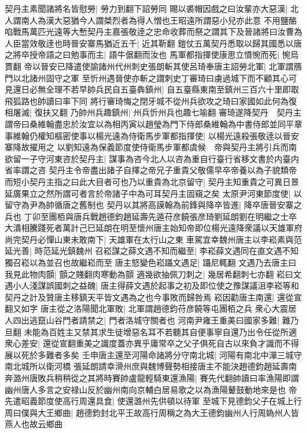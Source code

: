契丹主素聞諸將名皆慰勞|{
	勞力到翻下詔勞同}
賜以裘帽因戲之曰汝輩亦大惡漢|{
	北人謂南人為漢大惡猶今人謂桀烈者為得人憎也王昭遠所謂惡小兒亦此意}
不用鹽酪啗戰馬萬匹光遠等大慙契丹主嘉張敬逹之忠命收葬而祭之謂其下及晉諸將曰汝曹為人臣當效敬逹也時晉安寨馬猶近五千|{
	近其靳翻}
鎧仗五萬契丹悉取以歸其國悉以唐之將卒授帝語之曰勉事而主|{
	語牛倨翻而汝也}
馬軍都指揮使康思立憤惋而死|{
	惋烏貫翻}
帝以晉安已降遣使諭諸州代州刺史張朗斬其使呂琦奉唐主詔勞北軍|{
	北軍謂鴈門以北諸州固守之軍}
至忻州遇晉使亦斬之謂刺史丁審琦曰虜過城下而不顧其心可見還日必無全理不若早帥兵民自五臺犇鎮州|{
	自五臺縣東南至鎮州三百六十里即取飛狐路也帥讀曰率下同}
將行審琦悔之閉牙城不從州兵欲攻之琦曰家國如此何為復相屠滅|{
	復扶又翻}
乃帥州兵趣鎮州|{
	州兵忻州兵也趣七喻翻}
審琦遂降契丹　契丹主謂帝曰桑維翰盡忠於汝宜以為相丙寅以趙瑩為門下侍郎桑維翰為中書侍郎並同平章事維翰仍權知樞密使事以楊光遠為侍衛馬步軍都指揮使|{
	以楊光遠殺張敬逹以晉安寨降故擢用之}
以劉知遠為保義節度使侍衛馬步軍都虞候　帝與契丹主將引兵而南欲留一子守河東咨於契丹主|{
	謀事為咨今北人以咨為重自行臺行省移文書於内臺内省率謂之咨}
契丹主令帝盡出諸子自擇之帝兄子重貴父敬儒早卒帝養以為子貌類帝而短小契丹主指之曰此大目者可也乃以重貴為北京留守|{
	契丹主知重貴之可異日景延廣果立之然所謂可者言於帝諸子中為可耳契丹主固窺之矣}
太原尹河東節度使|{
	以留守為尹為帥循唐之舊制也}
契丹以其將高謨翰為前鋒與降卒皆進|{
	降卒唐晉安寨之兵也}
丁卯至團栢與唐兵戰趙德鈞趙延壽先遁苻彦饒張彦琦劉延朗劉在明繼之士卒大潰相騰踐死者萬計己巳延朗在明至懷州唐主始知帝即位楊光遠降衆議以天雄軍府尚完契丹必憚山東未敢南下|{
	天雄軍在太行山之東}
車駕宜幸魏州唐主以李崧素與范延光善|{
	時范延光鎮魏州}
召崧謀之薛文遇不知而繼至|{
	李崧薛文遇同在直文遇不知獨召崧以為並召也故繼崧而至}
唐主怒變色崧躡文遇足|{
	躡尼輒翻}
文遇乃去唐主曰我見此物肉顫|{
	顫之賤翻肉寒動為顫}
適幾欲抽佩刀刺之|{
	幾居希翻刺七亦翻}
崧曰文遇小人淺謀誤國刺之益醜|{
	唐主得薛文遇於起事之初及即位使之豫謀議沮李崧等和契丹之計及贊唐主移鎮天平皆文遇為之也今事敗而歸咎焉}
崧因勸唐主南還|{
	還從宣翻又如字}
唐主從之洛陽聞北軍敗|{
	北軍謂趙德鈞苻彦饒等屯團栢之兵}
衆心大震居人四出逃竄山谷門者請禁之|{
	門者洛城守關者也}
河南尹雍王重美曰國家多難|{
	難乃旦翻}
未能為百姓主又禁其求生徒增惡名耳不若聽其自便事寧自還乃出令任從所適衆心差安|{
	還從宣翻重美之識度蓋亦異乎庸常卒之父子俱死自古以來負才識而不得展以死於多難者多矣}
壬申唐主還至河陽命諸將分守南北城|{
	河陽有南北中潬三城守南北城所以衛河橋}
張延朗請幸滑州庶與魏博聲勢相接唐主不能決趙德鈞趙延壽南奔潞州唐敗兵稍稍從之其將時賽帥盧龍輕騎東還漁陽|{
	賽先代翻帥讀曰率漁陽即謂幽州唐人多言之安禄山反於幽州南向京輔白居易歌之以為漁陽鼙鼓動地來是也}
帝先遣昭義節度使高行周還具食|{
	使還潞州先供頓以待軍}
至城下見德鈞父子在城上行周曰僕與大王鄉曲|{
	趙德鈞封北平王故高行周稱之為大王德鈞幽州人行周媯州人皆燕人也故云鄉曲}
